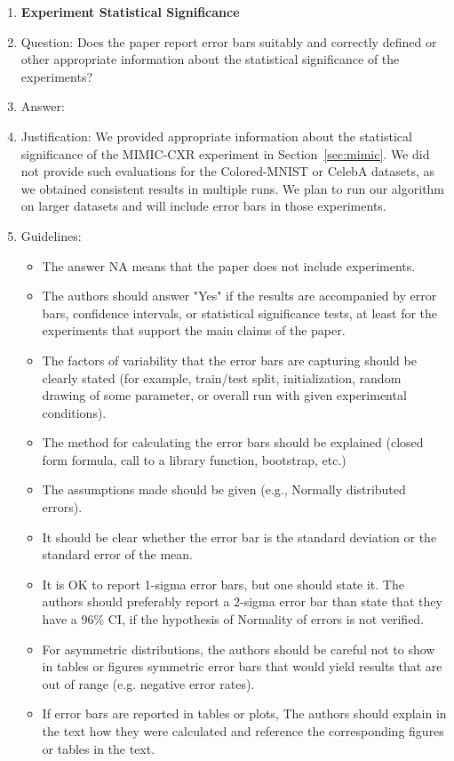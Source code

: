 \documentclass{article}
\theoremstyle{plain}
\theoremstyle{definition}
\theoremstyle{remark}
\begin{document}
\begin{enumerate}
\item {\bf Experiment Statistical Significance}
    \item[] Question: Does the paper report error bars suitably and correctly defined or other appropriate information about the statistical significance of the experiments?
    \item[] Answer: \answerYes{} %
    \item[] Justification: 
    We provided appropriate information about the statistical significance of the MIMIC-CXR experiment in Section~\ref{sec:mimic}. We did not provide such evaluations for the Colored-MNIST or CelebA datasets, as we obtained consistent results in multiple runs. We plan to run our algorithm on larger datasets and will include error bars in those experiments.
    \item[] Guidelines:
    \begin{itemize}
        \item The answer NA means that the paper does not include experiments.
        \item The authors should answer "Yes" if the results are accompanied by error bars, confidence intervals, or statistical significance tests, at least for the experiments that support the main claims of the paper.
        \item The factors of variability that the error bars are capturing should be clearly stated (for example, train/test split, initialization, random drawing of some parameter, or overall run with given experimental conditions).
        \item The method for calculating the error bars should be explained (closed form formula, call to a library function, bootstrap, etc.)
        \item The assumptions made should be given (e.g., Normally distributed errors).
        \item It should be clear whether the error bar is the standard deviation or the standard error of the mean.
        \item It is OK to report 1-sigma error bars, but one should state it. The authors should preferably report a 2-sigma error bar than state that they have a 96\% CI, if the hypothesis of Normality of errors is not verified.
        \item For asymmetric distributions, the authors should be careful not to show in tables or figures symmetric error bars that would yield results that are out of range (e.g. negative error rates).
        \item If error bars are reported in tables or plots, The authors should explain in the text how they were calculated and reference the corresponding figures or tables in the text.
    \end{itemize}


\end{enumerate}
\end{document}
